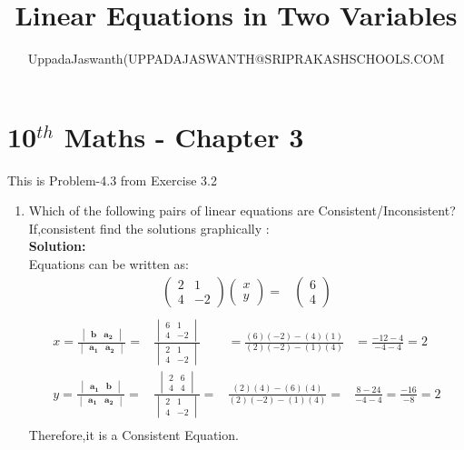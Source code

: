 \documentclass[12pt]{article}
\title{Linear Equations in Two Variables}
\author{UppadaJaswanth(UPPADAJASWANTH@SRIPRAKASHSCHOOLS.COM}
\newcommand{\myvec}[1]{\ensuremath{\begin{pmatrix}#1\end{pmatrix}}}
\newcommand{\mydet}[1]{\ensuremath{\begin{vmatrix}#1\end{vmatrix}}}
\newcommand{\solution}{\noindent \textbf{Solution: }}
\let\vec\mathbf
\begin{document}
\maketitle
\section*{10$^{th}$ Maths - Chapter 3}
This is Problem-4.3 from Exercise 3.2
\begin{enumerate}
\item Which of the following pairs of linear equations are Consistent/Inconsistent?If,consistent find the solutions graphically : \\
\solution \\
Equations can be written as:
\begin{align}
\myvec{2&1\\4&-2}\myvec{x\\y}=&\myvec{6\\4}\\
\end{align}
\begin{align}
x=\frac{\mydet{\vec{b}&\vec{a_2}}}{\mydet{\vec{a_1}&\vec{a_2}}} =&
\frac{\mydet{6&1\\4&-2}}{\mydet{2&1\\4&-2}}&=
\frac{(6)(-2)-(4)(1)}{(2)(-2)-(1)(4)}&=
\frac{-12-4}{-4-4}=
2\\
y=\frac{\mydet{\vec{a_1}&\vec{b}}}{\mydet{\vec{a_1}&\vec{a_2}}} =&
\frac{\mydet{ 2 & 6 \\ 4 & 4 }}{\mydet{ 2 & 1\\4 & -2}}=&
\frac{(2)(4)-(6)(4)}{(2)(-2)-(1)(4)}=&
\frac{8-24}{-4-4}=
\frac{-16}{-8}=2\\
\end{align}
Therefore,it is a Consistent Equation.
\end{enumerate}
\end{document}
